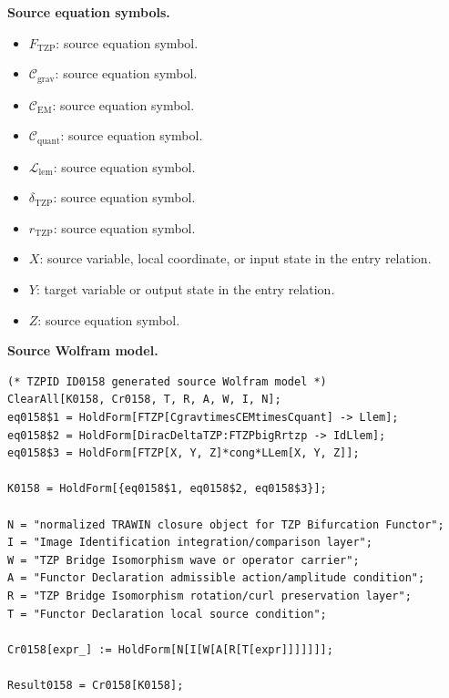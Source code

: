 \begin{minipage}[t]{0.49\linewidth}
\begingroup
\small
\raggedright
\textbf{Source equation symbols.}\par
\begin{itemize}[leftmargin=1.35em,itemsep=1pt,topsep=1pt,parsep=0pt]
    \item $F_{\mathrm{TZP}}$: source equation symbol.
    \item $\mathcal{C}_{\mathrm{grav}}$: source equation symbol.
    \item $\mathcal{C}_{\mathrm{EM}}$: source equation symbol.
    \item $\mathcal{C}_{\mathrm{quant}}$: source equation symbol.
    \item $\mathcal{L}_{\mathrm{lem}}$: source equation symbol.
    \item $\delta_{\mathrm{TZP}}$: source equation symbol.
    \item $r_{\mathrm{TZP}}$: source equation symbol.
    \item $X$: source variable, local coordinate, or input state in the entry relation.
    \item $Y$: target variable or output state in the entry relation.
    \item $Z$: source equation symbol.
\end{itemize}
\endgroup
\end{minipage}\hfill
\begin{minipage}[t]{0.47\linewidth}
\begingroup
\scriptsize
\raggedright
\textbf{Source Wolfram model.}\par
\begin{Verbatim}[fontsize=\tiny,breaklines=true,breakanywhere=true]
(* TZPID ID0158 generated source Wolfram model *)
ClearAll[K0158, Cr0158, T, R, A, W, I, N];
eq0158$1 = HoldForm[FTZP[CgravtimesCEMtimesCquant] -> Llem];
eq0158$2 = HoldForm[DiracDeltaTZP:FTZPbigRrtzp -> IdLlem];
eq0158$3 = HoldForm[FTZP[X, Y, Z]*cong*LLem[X, Y, Z]];

K0158 = HoldForm[{eq0158$1, eq0158$2, eq0158$3}];

N = "normalized TRAWIN closure object for TZP Bifurcation Functor";
I = "Image Identification integration/comparison layer";
W = "TZP Bridge Isomorphism wave or operator carrier";
A = "Functor Declaration admissible action/amplitude condition";
R = "TZP Bridge Isomorphism rotation/curl preservation layer";
T = "Functor Declaration local source condition";

Cr0158[expr_] := HoldForm[N[I[W[A[R[T[expr]]]]]]];

Result0158 = Cr0158[K0158];
\end{Verbatim}
\endgroup
\end{minipage}

